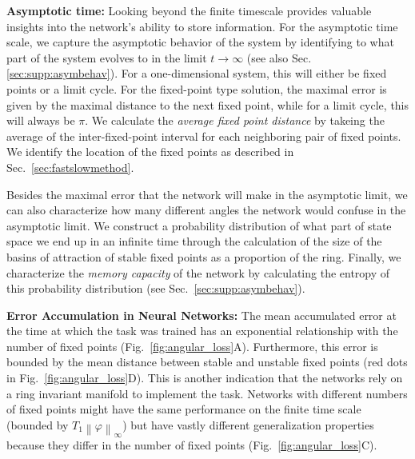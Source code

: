 \documentclass{article} %
\newcommand{\ptitle}[1]{\textbf{#1:}\xspace}
\newcounter{ct}
\newcommand{\uniformNorm}[1]{\left\|#1\right\|_\infty} %
\theoremstyle{definition}
\theoremstyle{remark}
\begin{document}
\ptitle{Asymptotic time}
Looking beyond the finite timescale provides valuable insights into the network's ability to store information.
For the asymptotic time scale, we capture the asymptotic behavior of the system by identifying to what part of the system evolves to in the limit \(t\rightarrow\infty\) (see also Sec.\ref{sec:supp:asymbehav}).
For a one-dimensional system, this will either be fixed points or a limit cycle.
For the fixed-point type solution, the maximal error is given by the maximal distance to the next fixed point, while for a limit cycle, this will always be \(\pi\).
We calculate the \emph{average fixed point distance} by takeing the average of the inter-fixed-point interval for each neighboring pair of fixed points.
We identify the location of the fixed points as described in Sec.~\ref{sec:fastslowmethod}.

Besides the maximal error that the network will make in the asymptotic limit, we can also characterize how many different angles the network would confuse in the asymptotic limit.
We construct a probability distribution of what part of state space we end up in an infinite time through the calculation of the size of the basins of attraction of stable fixed points as a proportion of the ring.
Finally, we characterize the \emph{memory capacity} of the network by calculating the entropy of this probability distribution (see Sec.~\ref{sec:supp:asymbehav}).


\ptitle{Error Accumulation in Neural Networks}
The mean accumulated error at the time at which the task was trained has an exponential relationship with the number of fixed points (Fig.~\ref{fig:angular_loss}A).
Furthermore, this error is bounded by the mean distance between stable and unstable fixed points (red dots in Fig.~\ref{fig:angular_loss}D).
This is another indication that the networks rely on a ring invariant manifold to implement the task.
Networks with different numbers of fixed points might have the same performance on the finite time scale (bounded by \(T_{1}\uniformNorm{\varphi}\)) %
 but have vastly different generalization properties because they differ in the number of fixed points (Fig.~\ref{fig:angular_loss}C).
\end{document}
